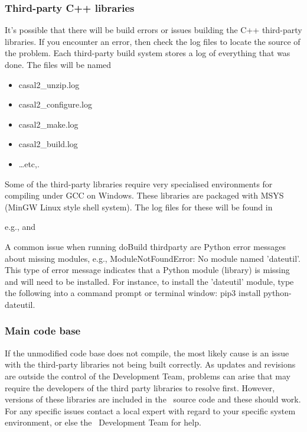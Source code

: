 \subsubsection{Third-party C++ libraries}

It's possible that there will be build errors or issues building the C++ third-party libraries. If you encounter an error, then check the log files to locate the source of the problem. Each third-party build system stores a log of everything that was done. The files will be named

\begin{itemize}
	\item casal2\_unzip.log
	\item casal2\_configure.log
	\item casal2\_make.log
	\item casal2\_build.log
	\item \dots etc,.
\end{itemize}

Some of the third-party libraries require very specialised environments for compiling under GCC on Windows. These libraries are packaged with MSYS (MinGW Linux style shell system). The log files for these will be found in 

e.g.,  
and 

A common issue when running doBuild thirdparty are Python error messages about missing modules, e.g., ModuleNotFoundError: No module named 'dateutil'. This type of error message indicates that a Python module (library) is missing and will need to be installed. For instance, to install the 'dateutil' module, type the following into a command prompt or terminal window: pip3 install python-dateutil.  

\subsubsection{Main code base}

If the unmodified code base does not compile, the most likely cause is an issue with the third-party libraries not being built correctly. As updates and revisions are outside the control of the Development Team, problems can arise that may require the developers of the third party libraries to resolve first. However, versions of these libraries are included in the \CNAME\ source code and these should work. For any specific issues contact a local expert with regard to your specific system environment, or else the \CNAME\ Development Team for help.
